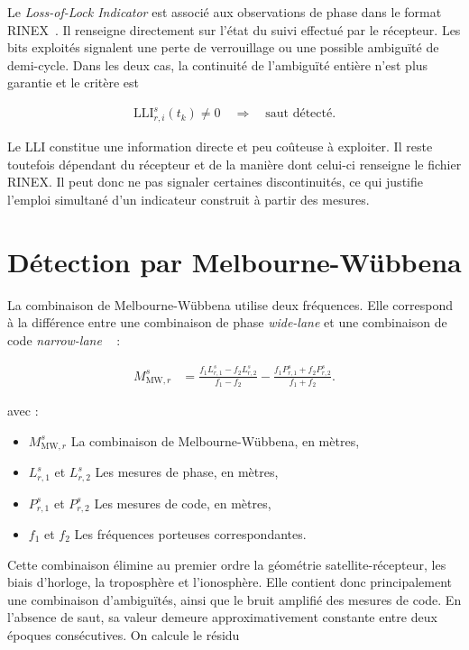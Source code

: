 Le \textit{Loss-of-Lock Indicator} est associé aux observations de phase dans
le format RINEX~\cite{rinex304}. Il renseigne directement sur l'état du suivi
effectué par le récepteur. Les bits exploités signalent une perte de
verrouillage ou une possible ambiguïté de demi-cycle. Dans les deux cas, la
continuité de l'ambiguïté entière n'est plus garantie et le critère est

\begin{align}
\mathrm{LLI}_{r,i}^s(t_k)\neq 0
\quad\Longrightarrow\quad
\text{saut détecté}.
\label{ann:eq:lli_detection}
\end{align}

Le LLI constitue une information directe et peu coûteuse à exploiter. Il reste
toutefois dépendant du récepteur et de la manière dont celui-ci renseigne le
fichier RINEX. Il peut donc ne pas signaler certaines discontinuités, ce qui
justifie l'emploi simultané d'un indicateur construit à partir des mesures.

\section{Détection par Melbourne-Wübbena}

La combinaison de Melbourne-Wübbena utilise deux fréquences. Elle correspond à
la différence entre une combinaison de phase \textit{wide-lane} et une
combinaison de code \textit{narrow-lane}
~\cite{blewitt1990,melbourne1985,wubbena1985} :

\begin{align}
M_{\mathrm{MW},r}^s
&=
\frac{f_1L_{r,1}^s-f_2L_{r,2}^s}{f_1-f_2}
-
\frac{f_1P_{r,1}^s+f_2P_{r,2}^s}{f_1+f_2}.
\label{ann:eq:melbourne_wubbena}
\end{align}

avec :

\begin{itemize}
    \item $M_{\mathrm{MW},r}^s$ La combinaison de Melbourne-Wübbena, en
    mètres,
    \item $L_{r,1}^s$ et $L_{r,2}^s$ Les mesures de phase, en mètres,
    \item $P_{r,1}^s$ et $P_{r,2}^s$ Les mesures de code, en mètres,
    \item $f_1$ et $f_2$ Les fréquences porteuses correspondantes.
\end{itemize}

Cette combinaison élimine au premier ordre la géométrie satellite-récepteur,
les biais d'horloge, la troposphère et l'ionosphère. Elle contient donc
principalement une combinaison d'ambiguïtés, ainsi que le bruit amplifié des
mesures de code. En l'absence de saut, sa valeur demeure approximativement
constante entre deux époques consécutives. On calcule le résidu

